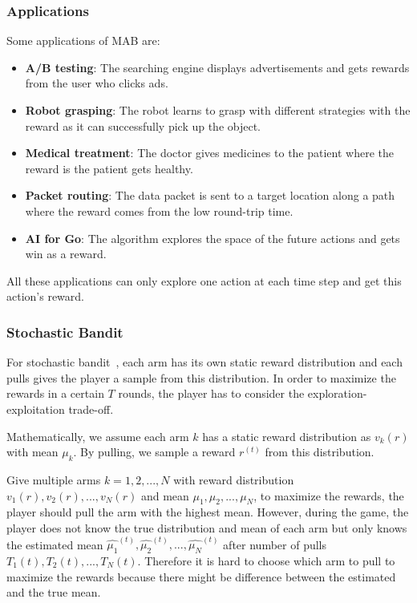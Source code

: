 \documentclass[11pt]{article}
\begin{document}
\subsubsection{Applications}
Some applications of MAB are:
\begin{itemize}
    \item \textbf{A/B testing}: The searching engine displays advertisements and gets rewards from the user who clicks ads.
    \item \textbf{Robot grasping}: The robot learns to grasp with different strategies with the reward as it can successfully pick up the object.
    \item \textbf{Medical treatment}: The doctor gives medicines to the patient where the reward is the patient gets healthy.
    \item \textbf{Packet routing}: The data packet is sent to a target location along a path where the reward comes from the low round-trip time.
    \item \textbf{AI for Go}: The algorithm explores the space of the future actions and gets win as a reward.
\end{itemize}
All these applications can only explore one action at each time step and get this action's reward.

\subsubsection{Stochastic Bandit}
For stochastic bandit~\cite{robbins1952some}, each arm has its own static reward distribution and each pulls gives the player a sample from this distribution. In order to maximize the rewards in a certain $T$ rounds, the player has to consider the exploration-exploitation trade-off.

Mathematically, we assume each arm $k$ has a static reward distribution as $v_k(r)$ with mean $\mu_k$. By pulling, we sample a reward $r^{(t)}$ from this distribution. 

Give multiple arms $k = 1, 2, ..., N$ with reward distribution $v_1(r), v_2(r), ..., v_N(r)$ and mean $\mu_1, \mu_2, ..., \mu_N$, to maximize the rewards, the player should pull the arm with the highest mean. However, during the game, the player does not know the true distribution and mean of each arm but only knows the estimated mean $\hat{\mu_1}^{(t)}, \hat{\mu_2}^{(t)}, ..., \hat{\mu_N}^{(t)}$ after number of pulls $T_1(t), T_2(t), ..., T_N(t)$. Therefore it is hard to choose which arm to pull to maximize the rewards because there might be difference between the estimated and the true mean.
\end{document}
